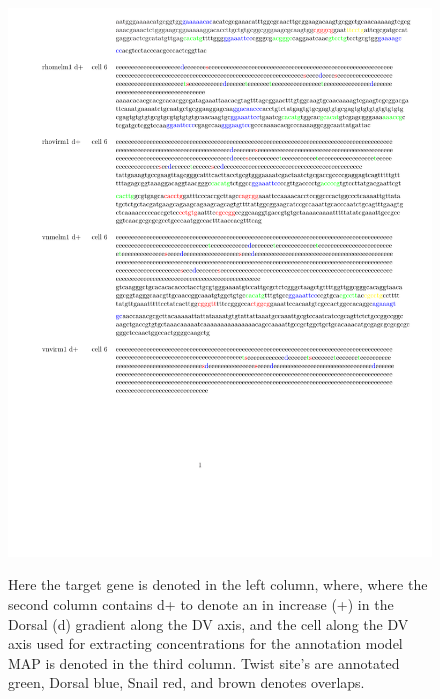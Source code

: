 %

\begin{figure}
  \includegraphics[height=1\textwidth]{annc}\\
  \caption{Here the target gene is denoted in the left column, where, where the second column contains d+ to denote an in increase (+) in the Dorsal (d) gradient along the DV axis, and the cell along the DV axis used for extracting concentrations for the annotation model MAP is denoted in the third column.  Twist site's are annotated green, Dorsal blue, Snail red, and brown denotes overlaps. }\label{annc}
\end{figure}

